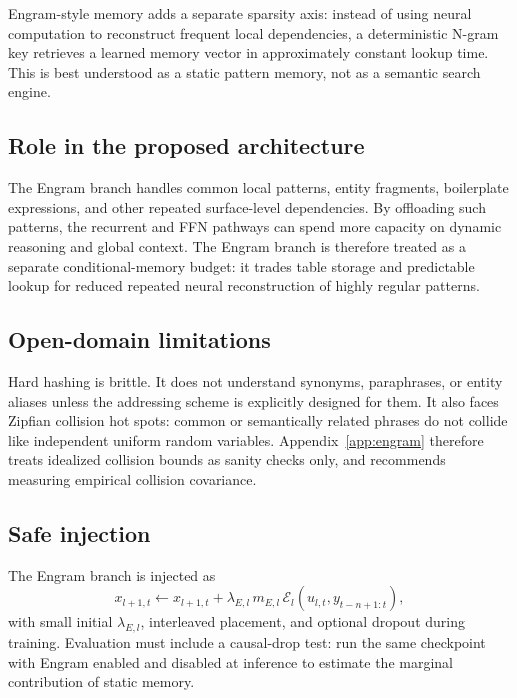 \documentclass[11pt]{article}
\newcommand{\Eng}{\mathcal{E}}
\begin{document}
Engram-style memory adds a separate sparsity axis: instead of using neural computation to reconstruct frequent local dependencies, a deterministic N-gram key retrieves a learned memory vector in approximately constant lookup time. This is best understood as a static pattern memory, not as a semantic search engine.

\subsection{Role in the proposed architecture}

The Engram branch handles common local patterns, entity fragments, boilerplate expressions, and other repeated surface-level dependencies. By offloading such patterns, the recurrent and FFN pathways can spend more capacity on dynamic reasoning and global context. The Engram branch is therefore treated as a separate conditional-memory budget: it trades table storage and predictable lookup for reduced repeated neural reconstruction of highly regular patterns.

\subsection{Open-domain limitations}

Hard hashing is brittle. It does not understand synonyms, paraphrases, or entity aliases unless the addressing scheme is explicitly designed for them. It also faces Zipfian collision hot spots: common or semantically related phrases do not collide like independent uniform random variables. Appendix~\ref{app:engram} therefore treats idealized collision bounds as sanity checks only, and recommends measuring empirical collision covariance.

\subsection{Safe injection}

The Engram branch is injected as
\begin{equation}
\label{eq:engram-inject}
x_{l+1,t} \leftarrow x_{l+1,t} + \lambda_{E,l}\,m_{E,l}\,\Eng_l(u_{l,t}, y_{t-n+1:t}),
\end{equation}
with small initial $\lambda_{E,l}$, interleaved placement, and optional dropout during training. Evaluation must include a causal-drop test: run the same checkpoint with Engram enabled and disabled at inference to estimate the marginal contribution of static memory.
\end{document}
